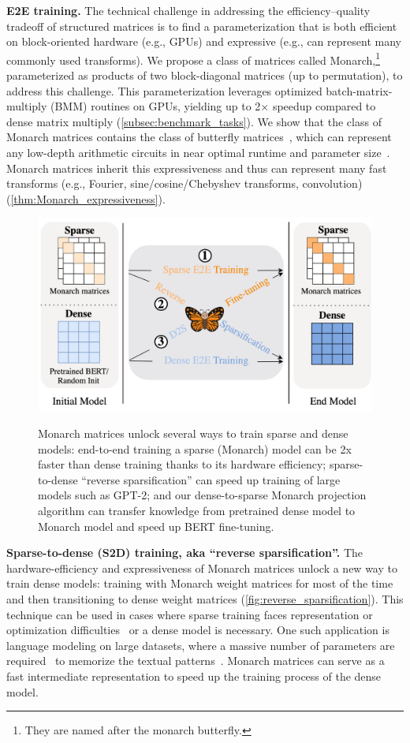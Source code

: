 \textbf{E2E training.}
The technical challenge in addressing the efficiency--quality tradeoff of structured matrices is to find a parameterization that is both efficient on block-oriented hardware (e.g., GPUs) and expressive (e.g., can represent many commonly used transforms).
We propose a class of matrices called Monarch,\footnote{They are named after the monarch butterfly.} parameterized as products of two block-diagonal matrices (up to permutation), to address this challenge.
This parameterization leverages optimized batch-matrix-multiply (BMM) routines on GPUs, yielding up to 2$\times$ speedup compared to dense matrix multiply (\cref{subsec:benchmark_tasks}).
We show that the class of Monarch matrices contains the class of butterfly matrices~\citep{parker1995random,dao2019learning}, which can represent any low-depth arithmetic circuits in near optimal runtime and parameter size~\citep{dao2020kaleidoscope}.
Monarch matrices inherit this expressiveness and thus can represent many fast transforms (e.g., Fourier, sine/cosine/Chebyshev transforms, convolution) (\cref{thm:Monarch_expressiveness}).
\begin{figure}[t]
  \centering
  \includegraphics[width=.49\textwidth]{figures/Monarch-main.png}
  \label{fig:diagram}
  \vspace{-5mm}
  \caption{Monarch matrices unlock several ways to train sparse and dense models: end-to-end training a sparse (Monarch) model can be 2x faster than dense training thanks to its hardware efficiency; sparse-to-dense ``reverse sparsification'' can speed up training of large models such as GPT-2; and our dense-to-sparse Monarch projection algorithm can transfer knowledge from pretrained dense model to Monarch model and speed up BERT fine-tuning.}
  \vspace{-1.0em}
\end{figure}

\textbf{Sparse-to-dense (S2D) training, aka ``reverse sparsification''.} The hardware-efficiency and expressiveness of Monarch matrices unlock a new way to train dense models:
training with Monarch weight matrices for most of the time and then transitioning to dense weight matrices (\cref{fig:reverse_sparsification}).
This technique can be used in cases where sparse training faces representation or optimization difficulties~\citep{evci2019difficulty} or a dense model is necessary.
One such application is language modeling on large datasets, where a massive number of parameters are required~\citep{kaplan2020scaling} to memorize the textual patterns~\citep{geva2020transformer}.
Monarch matrices can serve as a fast intermediate representation to speed up the training process of the dense model.

